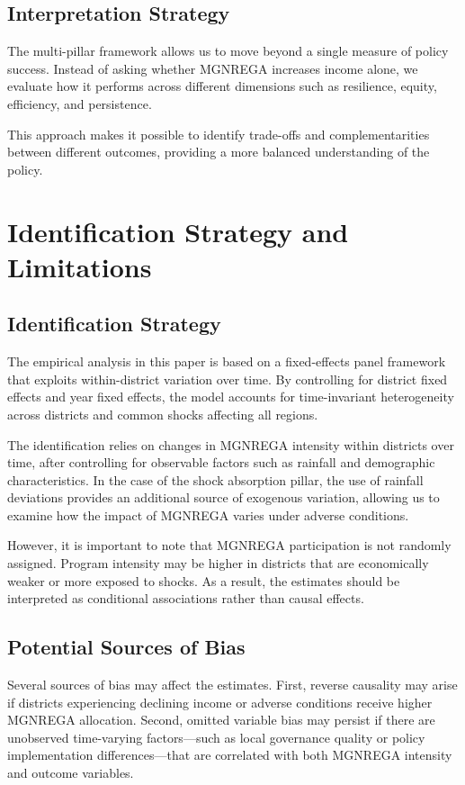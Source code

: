\documentclass[12pt]{article}
\begin{document}
\subsection{Interpretation Strategy}

The multi-pillar framework allows us to move beyond a single measure of policy success. Instead of asking whether MGNREGA increases income alone, we evaluate how it performs across different dimensions such as resilience, equity, efficiency, and persistence.

This approach makes it possible to identify trade-offs and complementarities between different outcomes, providing a more balanced understanding of the policy.

\section{Identification Strategy and Limitations}

\subsection{Identification Strategy}

The empirical analysis in this paper is based on a fixed-effects panel framework that exploits within-district variation over time. By controlling for district fixed effects and year fixed effects, the model accounts for time-invariant heterogeneity across districts and common shocks affecting all regions.

The identification relies on changes in MGNREGA intensity within districts over time, after controlling for observable factors such as rainfall and demographic characteristics. In the case of the shock absorption pillar, the use of rainfall deviations provides an additional source of exogenous variation, allowing us to examine how the impact of MGNREGA varies under adverse conditions.

However, it is important to note that MGNREGA participation is not randomly assigned. Program intensity may be higher in districts that are economically weaker or more exposed to shocks. As a result, the estimates should be interpreted as conditional associations rather than causal effects.

\subsection{Potential Sources of Bias}

Several sources of bias may affect the estimates. First, reverse causality may arise if districts experiencing declining income or adverse conditions receive higher MGNREGA allocation. Second, omitted variable bias may persist if there are unobserved time-varying factors—such as local governance quality or policy implementation differences—that are correlated with both MGNREGA intensity and outcome variables.
\end{document}
